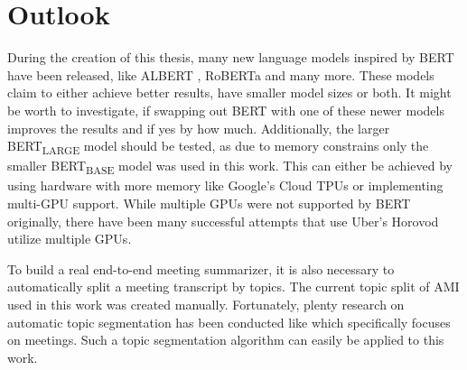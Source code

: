 \chapter{Outlook}\label{ch:outlook}

During the creation of this thesis, many new language models inspired by BERT have been released, like ALBERT \cite{1909.11942}, RoBERTa \cite{1907.11692} and many more.
These models claim to either achieve better results, have smaller model sizes or both.
It might be worth to investigate, if swapping out BERT with one of these newer models improves the results and if yes by how much.
Additionally, the larger BERT\textsubscript{LARGE} model should be tested, as due to memory constrains only the smaller BERT\textsubscript{BASE} model was used in this work.
This can either be achieved by using hardware with more memory like Google's Cloud TPUs or implementing multi-GPU support.
While multiple GPUs were not supported by BERT originally, there have been many successful attempts that use Uber's Horovod \cite{sergeev2018horovod} utilize multiple GPUs.


To build a real end-to-end meeting summarizer, it is also necessary to automatically split a meeting transcript by topics.
The current topic split of AMI used in this work was created manually.
Fortunately, plenty research on automatic topic segmentation has been conducted like \cite{10.3115/1075096.1075167} which specifically focuses on meetings.
Such a topic segmentation algorithm can easily be applied to this work.